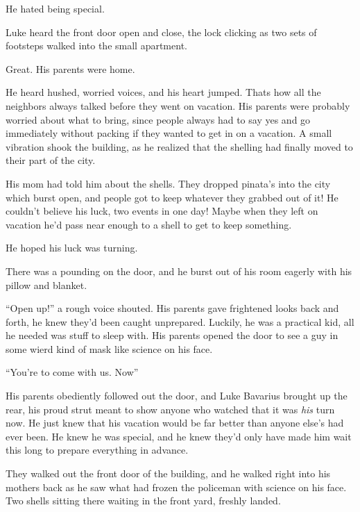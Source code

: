 He hated being special.



Luke heard the front door open and close, the lock clicking as two
sets of footsteps walked into the small apartment.



Great. His parents were home.



He heard hushed, worried voices, and his heart jumped. Thats how
all the neighbors always talked before they went on vacation. His
parents were probably worried about what to bring, since people
always had to say yes and go immediately without packing if they
wanted to get in on a vacation. A small vibration shook the
building, as he realized that the shelling had finally moved to
their part of the city.



His mom had told him about the shells. They dropped pinata's into
the city which burst open, and people got to keep whatever they
grabbed out of it! He couldn't believe his luck, two events in one
day! Maybe when they left on vacation he'd pass near enough to a
shell to get to keep something.



He hoped his luck was turning.



There was a pounding on the door, and he burst out of his room
eagerly with his pillow and blanket.



``Open up!'' a rough voice shouted. His parents gave frightened looks
back and forth, he knew they'd been caught unprepared. Luckily, he
was a practical kid, all he needed was stuff to sleep with. His
parents opened the door to see a guy in some wierd kind of mask
like science on his face.



``You're to come with us. Now''



His parents obediently followed out the door, and Luke Bavarius
brought up the rear, his proud strut meant to show anyone who
watched that it was {\em his} turn now. He just knew that his
vacation would be far better than anyone else's had ever been. He
knew he was special, and he knew they'd only have made him wait
this long to prepare everything in advance.



They walked out the front door of the building, and he walked right
into his mothers back as he saw what had frozen the policeman with
science on his face. Two shells sitting there waiting in the front
yard, freshly landed.



